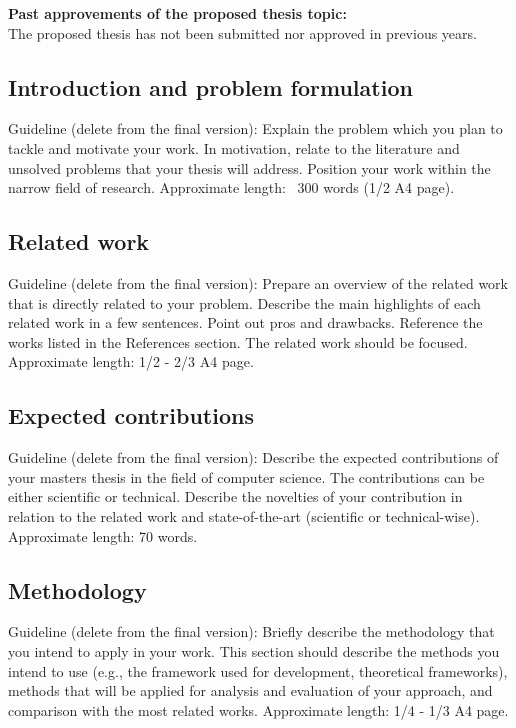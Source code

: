 \documentclass[a4paper, 12pt]{article}
\newcommand\cmnt[1]{\textcolor{munsell}{#1}}
\begin{document}
\textbf{Past approvements of the proposed thesis topic:}\\
The proposed thesis has not been submitted nor approved in previous years.


\subsection{Introduction and problem formulation}

\cmnt{
Guideline (delete from the final version):
Explain the problem which you plan to tackle and motivate your work. In motivation, relate to the literature and unsolved problems that your thesis will address. Position your work within the narrow field of research.  Approximate length: ~300 words (1/2 A4 page).}


\subsection{Related work}

\cmnt{
Guideline (delete from the final version):
Prepare an overview of the related work that is directly related to your problem. Describe the main highlights of each related work in a few sentences. Point out pros and drawbacks. Reference the works listed in the References section. The related work should be focused. Approximate length: 1/2 - 2/3 A4 page.}

\subsection{Expected contributions}

\cmnt{
Guideline (delete from the final version):
Describe the expected contributions of your masters thesis in the field of computer science. The contributions can be either scientific or technical. Describe the novelties of your contribution in relation to the related work and state-of-the-art (scientific or technical-wise). Approximate length: 70 words.}

\subsection{Methodology}

\cmnt{
Guideline (delete from the final version):
Briefly describe the methodology that you intend to apply in your work. This section should describe the methods you intend to use (e.g., the framework used for development, theoretical frameworks), methods that will be applied for analysis and evaluation of your approach, and comparison with the most related works. Approximate length: 1/4 - 1/3 A4 page.}
\end{document}
